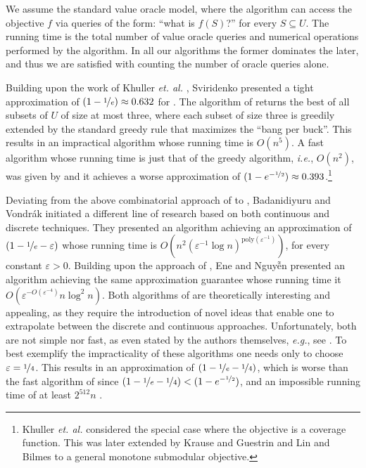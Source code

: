 \documentclass[a4paper,UKenglish,cleveref, autoref]{lipics-v2019}
\begin{document}
We assume the standard value oracle model, where the algorithm can access the objective $f$ via queries of the form: ``what is $f(S)$?'' for every $S\subseteq U$.
The running time is the total number of value oracle queries and numerical operations performed by the algorithm. In all our algorithms the former dominates the later, and thus we are satisfied with counting the number of oracle queries alone.

Building upon the work of Khuller {\em et. al.} \cite{khuller1999budgeted}, Sviridenko \cite{sviridenko2004note} presented a tight approximation of $(1-\nicefrac[]{1}{e})\approx 0.632$ for \SK.
The algorithm of \cite{sviridenko2004note} returns the best of all subsets of $U$ of size at most three, where each subset of size three is greedily extended by the standard greedy rule that maximizes the ``bang per buck''.
This results in an impractical algorithm whose running time is $O(n^5)$.
A fast algorithm whose running time is just that of the greedy algorithm, {\em i.e.}, $O(n^2)$, was given by \cite{khuller1999budgeted} and it achieves a worse approximation of $(1-e^{-\nicefrac[]{1}{2}})\approx 0.393$.\footnote{Khuller {\em et. al.} \cite{khuller1999budgeted} considered the special case where the objective is a coverage function. This was later extended by Krause and Guestrin \cite{krause2005note} and Lin and Bilmes \cite{LB10} to a general monotone submodular objective.}


Deviating from the above combinatorial approach of \cite{khuller1999budgeted,sviridenko2004note} to \SK, Badanidiyuru and Vondr\'{a}k \cite{badanidiyuru2014fast} initiated a different line of research based on both continuous and discrete techniques.
They presented an algorithm achieving an approximation of $(1-\nicefrac[]{1}{e}-\varepsilon)$ whose running time is $O(n^2(\varepsilon ^{-1}\log n)^{\text{poly}(\varepsilon^{-1})})$, for every constant $\varepsilon >0$.
Building upon the approach of \cite{badanidiyuru2014fast}, Ene and Nguy\~{\^{e}}n \cite{Alina2017} presented an algorithm achieving the same approximation guarantee whose running time it $O(\varepsilon^{-O(\varepsilon^{-4})}n \log^2 n)$.
Both algorithms of \cite{badanidiyuru2014fast,Alina2017} are theoretically interesting and appealing, as they require the introduction of novel ideas that enable one to extrapolate between the discrete and continuous approaches.
Unfortunately, both are not simple nor fast, as even stated by the authors themselves, {\em e.g.}, see \cite{Alina2017}.
To best exemplify the impracticality of these algorithms one needs only to choose $\varepsilon = \nicefrac[]{1}{4}$.
This results in an approximation of $(1-\nicefrac[]{1}{e}-\nicefrac[]{1}{4})$, which is worse than the fast algorithm of \cite{khuller1999budgeted} since $(1-\nicefrac[]{1}{e}-\nicefrac[]{1}{4})<(1-e^{-\nicefrac[]{1}{2}})$, and an impossible running time of at least $2^{512} n$ \cite{Alina2017}.
\end{document}
